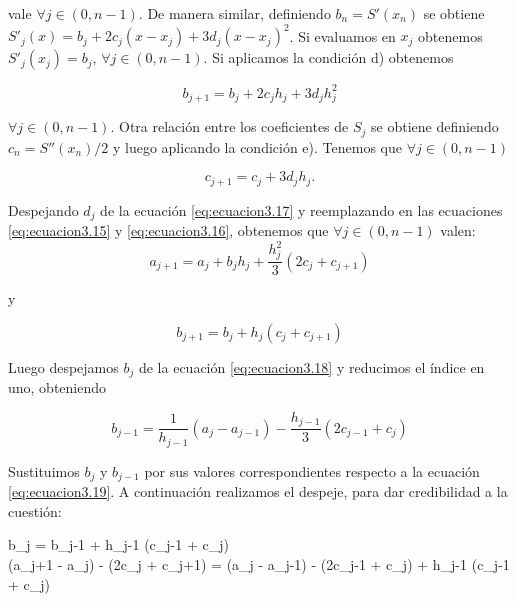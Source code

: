 vale $\forall j \in (0, n-1)$. De manera similar, definiendo $b_{n} = S'(x_{n})$ se obtiene $S'_{j}(x) = b_{j} + 2c_{j} (x - x_{j}) + 3d_{j} (x - x_{j})^{2}$.
Si evaluamos en $x_{j}$ obtenemos  $S'_{j}(x_{j}) = b_{j}$, $\forall j \in (0, n-1)$. Si aplicamos la condición d) obtenemos

\begin{equation} \label{eq:ecuacion3.16}
b_{j+1} = b_{j} + 2c_{j} h_{j} + 3d_{j} h_{j}^{2}
\end{equation}

$\forall j \in (0, n-1)$. Otra relación entre los coeficientes de $S_{j}$ se obtiene definiendo $c_{n} = S''(x_{n})/2$ y luego aplicando la condición e). Tenemos que $\forall j \in (0, n-1)$ 

\begin{equation} \label{eq:ecuacion3.17}
c_{j+1} = c_{j} + 3d_{j} h_{j}.
\end{equation}

Despejando $d_{j}$ de la ecuación \ref{eq:ecuacion3.17} y reemplazando en las ecuaciones \ref{eq:ecuacion3.15} y \ref{eq:ecuacion3.16}, obtenemos que $\forall j \in (0, n-1)$ valen:\\

\begin{equation} \label{eq:ecuacion3.18}
a_{j+1} = a_{j} + b_{j} h_{j} + \frac{h_{j}^{2}}{3} (2c_{j} + c_{j+1})
\end{equation}
\begin{center} y \end{center}
\begin{equation} \label{eq:ecuacion3.19}
b_{j+1} = b_{j} + h_{j} (c_{j} + c_{j+1})
\end{equation}


Luego despejamos $b_{j}$ de la ecuación \ref{eq:ecuacion3.18} y reducimos el índice en uno, obteniendo 

\begin{equation} \label{eq:ecuacion3.20}
b_{j-1} = \frac{1}{h_{j-1}} (a_{j} - a_{j-1}) - \frac{h_{j-1}}{3} (2c_{j-1} + c_{j})                                
\end{equation}

Sustituimos $b_{j}$ y $b_{j-1}$ por sus valores correspondientes respecto a la ecuación \ref{eq:ecuacion3.19}. A continuación realizamos el despeje, para dar credibilidad a la cuestión:

b_{j} = b_{j-1} + h_{j-1} (c_{j-1} + c_{j})$$

$$ (a_{j+1} - a_{j}) -  (2c_{j} + c_{j+1}) =  (a_{j} - a_{j-1}) -  (2c_{j-1} + c_{j}) + h_{j-1} (c_{j-1} + c_{j})$$


